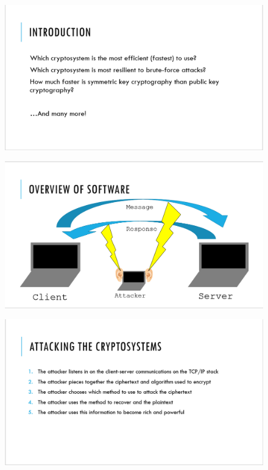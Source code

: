 \documentclass[12pt]{report}
\begin{document}
\begin{figure}[hp!] %
    \begin{center}
        \includegraphics[width=0.85\linewidth]{Pictures/slide2.PNG}
        \label{fig:slide2}
    \end{center}
\end{figure}

\begin{figure}[hp!] %
    \begin{center}
        \includegraphics[width=0.85\linewidth]{Pictures/slide3.PNG}
        \label{fig:slide3}
    \end{center}
\end{figure}

\begin{figure}[hp!] %
    \begin{center}
        \includegraphics[width=0.85\linewidth]{Pictures/slide4.PNG}
        \label{fig:slide4}
    \end{center}
\end{figure}
\end{document}
